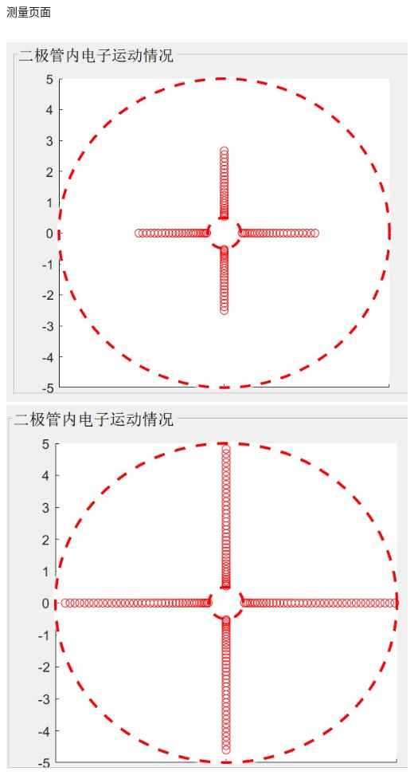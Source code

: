 \documentclass{beamer}
\begin{document}
\begin{frame}{测量页面}{\thesection \, \secname}
\begin{columns}
\begin{column}{0.3\textwidth}
                \includegraphics[scale=0.3]{gallery/move3.jpg}
                \includegraphics[scale=0.3]{gallery/move4.jpg}
            \end{column}
        \end{columns}
    \end{frame}
\end{document}

